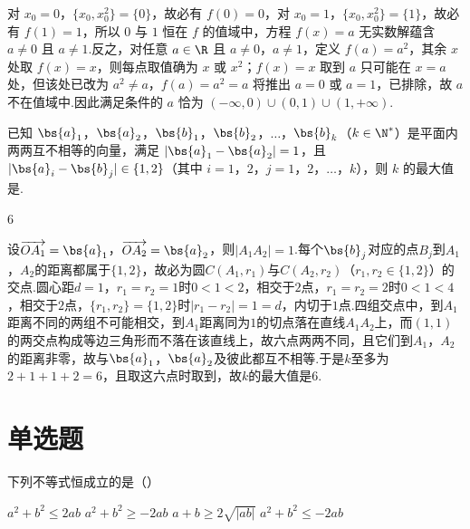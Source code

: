 \begin{solution}
对 \(x_0=0\)，\(\{x_0,x_0^2\}=\{0\}\)，故必有 \(f(0)=0\)，对 \(x_0=1\)，\(\{x_0,x_0^2\}=\{1\}\)，故必有 \(f(1)=1\)，所以 \(0\) 与 \(1\) 恒在 \(f\) 的值域中，方程 \(f(x)=a\) 无实数解蕴含 \(a\ne0\) 且 \(a\ne1\).反之，对任意 \(a\in\R\) 且 \(a\ne0\)，\(a\ne1\)，定义 \(f(a)=a^2\)，其余 \(x\) 处取 \(f(x)=x\)，则每点取值确为 \(x\) 或 \(x^2\)；\(f(x)=x\) 取到 \(a\) 只可能在 \(x=a\) 处，但该处已改为 \(a^2\ne a\)，\(f(a)=a^2=a\) 将推出 \(a=0\) 或 \(a=1\)，已排除，故 \(a\) 不在值域中.因此满足条件的 \(a\) 恰为 \((-\infty,0)\cup(0,1)\cup(1,+\infty)\).
\end{solution}

\begin{problem}
已知 \(\bs{a}_1\)，\(\bs{a}_2\)，\(\bs{b}_1\)，\(\bs{b}_2\)，\(\ldots\)，\(\bs{b}_k\)（\(k\in\N^*\)）是平面内两两互不相等的向量，满足 \(|\bs{a}_1-\bs{a}_2|=1\)，且 \(|\bs{a}_i-\bs{b}_j|\in\{1,2\}\)（其中 \(i=1\)，\(2\)，\(j=1\)，\(2\)，\(\ldots\)，\(k\)），则 \(k\) 的最大值是\fillinblank{}.

\end{problem}

\begin{answer}
\(6\)
\end{answer}

\begin{solution}
设\(\overrightarrow{OA_1}=\bs{a}_1\)，\(\overrightarrow{OA_2}=\bs{a}_2\)，则\(|A_1A_2|=1\).每个\(\bs{b}_j\)对应的点\(B_j\)到\(A_1\)，\(A_2\)的距离都属于\(\{1,2\}\)，故必为圆\(C(A_1,r_1)\)与\(C(A_2,r_2)\)（\(r_1,r_2\in\{1,2\}\)）的交点.圆心距\(d=1\)，\(r_1=r_2=1\)时\(0<1<2\)，相交于\(2\)点，\(r_1=r_2=2\)时\(0<1<4\)，相交于\(2\)点，\(\{r_1,r_2\}=\{1,2\}\)时\(|r_1-r_2|=1=d\)，内切于\(1\)点.四组交点中，到\(A_1\)距离不同的两组不可能相交，到\(A_1\)距离同为\(1\)的切点落在直线\(A_1A_2\)上，而\((1,1)\)的两交点构成等边三角形而不落在该直线上，故六点两两不同，且它们到\(A_1\)，\(A_2\)的距离非零，故与\(\bs{a}_1\)，\(\bs{a}_2\)及彼此都互不相等.于是\(k\)至多为\(2+1+1+2=6\)，且取这六点时取到，故\(k\)的最大值是\(6\).
\end{solution}
\section{单选题}

\begin{problem}
下列不等式恒成立的是（\quad）

\choices
    {\(a^2+b^2\le2ab\)}
    {\(a^2+b^2\ge-2ab\)}
    {\(a+b\ge2\sqrt{|ab|}\)}
    {\(a^2+b^2\le-2ab\)}
\end{problem}

